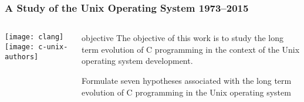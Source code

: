 \begin{frame}[plain]
	\frametitle{A Study of the Unix Operating System 1973–2015}
	
	
	
	\begin{columns}
		
		\begin{column}{.3\textwidth}
			
			\texttt{[image: clang]}
			\texttt{[image: c-unix-authors]}
		\end{column}
		
		\begin{column}{.7\textwidth}
			
			\LARGE
			\begin{block}{objective}
			The objective of this work is to study the long term evolution of C programming in the context of the Unix operating system development. 
			\end{block}
		
			Formulate seven hypotheses associated with the long term evolution of C programming in		the Unix operating system

			
		\end{column}
		
		
	\end{columns}
	
	
\end{frame}



